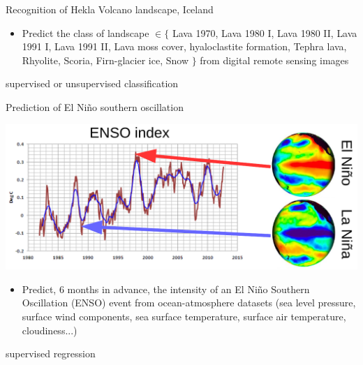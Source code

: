 \documentclass[pressentation,9pt,aspectratio=1610,xcolor=table]{beamer}
\newcommand{\doigt}{\noindent \Pisymbol{pzd}{43}}
\begin{document}
\begin{frame}{Recognition of Hekla Volcano landscape, Iceland}
  \begin{itemize}
  \item[\doigt] Predict the class of landscape $\in \{$ \textcolor{c1}{Lava 1970}, \textcolor{c2}{Lava 1980 I}, \textcolor{c3}{Lava 1980 II},  \textcolor{c4}{Lava 1991 I}, \textcolor{c5}{Lava 1991 II}, \textcolor{c6}{Lava moss cover}, \textcolor{c7}{hyaloclastite formation}, \textcolor{c8}{Tephra lava}, \textcolor{c9}{Rhyolite}, \textcolor{c10}{Scoria}, \textcolor{c11}{Firn-glacier ice}, \textcolor{c12}{Snow} $\}$ from digital remote sensing images
  \end{itemize}

\begin{center}
  \alert{supervised or unsupervised classification}
\end{center}
\end{frame}


\begin{frame}{Prediction of El Niño southern oscillation}
  \begin{center}
    \includegraphics[width=.8\linewidth]{ENSO_Nino_Nina.png}
  \end{center}
  
  \begin{itemize}
  \item[\doigt] Predict, 6 months in advance, the intensity of an El Niño Southern Oscillation (ENSO) event from ocean-atmosphere datasets (sea level pressure, surface wind components, sea surface temperature, surface air temperature, cloudiness...)
  \end{itemize}
  \begin{center}
    \alert{supervised regression}
  \end{center}
\end{frame}
\end{document}
